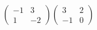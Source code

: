 \hspace*{2mm}\begin{minipage}[t]{\dimexpr\linewidth-2mm\relax}\vspace{0pt}
$\begin{pmatrix} -1 & 3 \\ 1 & -2 \end{pmatrix}\begin{pmatrix} 3 & 2 \\ -1 & 0 \end{pmatrix}$\end{minipage}

